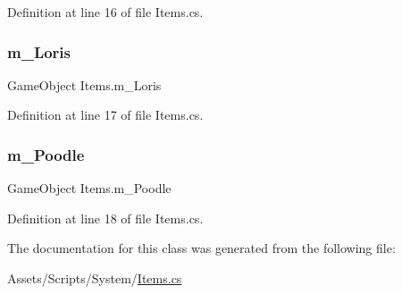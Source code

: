 Definition at line 16 of file Items.\+cs.

\mbox{\label{class_items_a4b705c4c596f35fe848b41184651741c}} 
\subsubsection{\texorpdfstring{m\+\_\+\+Loris}{m\_Loris}}
{\footnotesize\ttfamily Game\+Object Items.\+m\+\_\+\+Loris}



Definition at line 17 of file Items.\+cs.

\mbox{\label{class_items_a6127453089ccdf137d7e88d156a2e372}} 
\subsubsection{\texorpdfstring{m\+\_\+\+Poodle}{m\_Poodle}}
{\footnotesize\ttfamily Game\+Object Items.\+m\+\_\+\+Poodle}



Definition at line 18 of file Items.\+cs.



The documentation for this class was generated from the following file\+:\begin{DoxyCompactItemize}
\item 
Assets/\+Scripts/\+System/\mbox{\hyperlink{_items_8cs}{Items.\+cs}}\end{DoxyCompactItemize}
